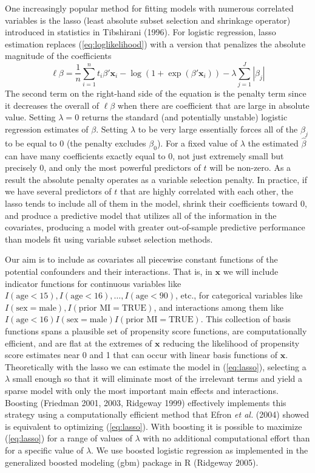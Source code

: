 \documentclass{article}
\begin{document}
One increasingly popular method for fitting models with numerous correlated
variables is the lasso (least absolute subset selection and shrinkage operator)
introduced in statistics in Tibshirani (1996). For logistic regression, lasso
estimation replaces (\ref{eq:loglikelihood}) with a version that penalizes the
absolute magnitude of the coefficients
\begin{equation}
\ell{\beta}=\frac{1}{n}\sum_{i=1}^n
t_i\beta'\mathbf{x}_i-\log\left(1+\exp(\beta'\mathbf{x}_i)\right) -
\lambda\sum_{j=1}^J|\beta_j| \label{eq:lasso}
\end{equation}
The second term on the right-hand side of the equation is the penalty term since it
decreases the overall of $\ell{\beta}$ when there are coefficient that are large in 
absolute value.  Setting $\lambda=0$ returns the standard (and potentially unstable) logistic
regression estimates of $\beta$. Setting $\lambda$ to be very large essentially
forces all of the $\beta_j$ to be equal to 0 (the penalty excludes $\beta_0$).
For a fixed value of $\lambda$ the estimated $\hat\beta$ can have many
coefficients exactly equal to 0, not just extremely small but precisely 0, and
only the most powerful predictors of $t$ will be non-zero. As a result the
absolute penalty operates as a variable selection penalty. In practice, if we
have several predictors of $t$ that are highly correlated with each other, the
lasso tends to include all of them in the model, shrink their coefficients
toward 0, and produce a predictive model that utilizes all of the information
in the covariates, producing a model with greater out-of-sample predictive
performance than models fit using variable subset selection methods.

Our aim is to include as covariates all piecewise constant functions of the
potential confounders and their interactions. That is, in $\mathbf{x}$ we will
include indicator functions for continuous variables like $I(\mbox{age}<15),
I(\mbox{age}<16), \ldots, I(\mbox{age}<90)$, etc., for categorical variables
like $I(\mbox{sex}=\mbox{male}), I(\mbox{prior MI}=\mbox{TRUE})$, and
interactions among them like $I(\mbox{age}<16)I(\mbox{sex} =
\mbox{male})I(\mbox{prior MI}=\mbox{TRUE})$. This collection of basis functions
spans a plausible set of propensity score functions, are computationally
efficient, and are flat at the extremes of $\mathbf{x}$ reducing the likelihood
of propensity score estimates near 0 and 1 that can occur with linear basis
functions of $\mathbf{x}$. Theoretically with the lasso we can estimate the
model in (\ref{eq:lasso}), selecting a $\lambda$ small enough so that it will
eliminate most of the irrelevant terms and yield a sparse model with only the
most important main effects and interactions. Boosting (Friedman 2001, 2003,
Ridgeway 1999) effectively implements this strategy using a computationally
efficient method that Efron \textit{et al.} (2004) showed is equivalent to
optimizing (\ref{eq:lasso}). With boosting it is possible to maximize
(\ref{eq:lasso}) for a range of values of $\lambda$ with no additional
computational effort than for a specific value of $\lambda$. We use boosted
logistic regression as implemented in the generalized boosted modeling (gbm)
package in R (Ridgeway 2005).
\end{document}

